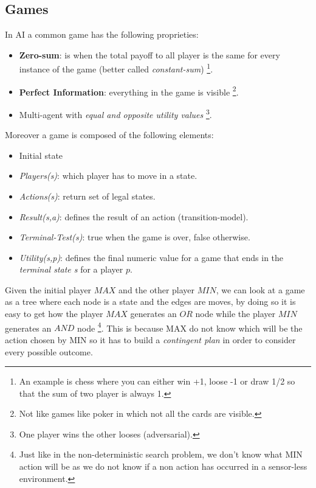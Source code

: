 \documentclass[10pt,a4paper]{article}
\begin{document}
\subsection{Games}
In AI a common game has the following proprieties:

\begin{itemize}
\item \textbf{Zero-sum}: is when the total payoff to all player is the same for every instance of the game (better called \textit{constant-sum}) \footnote{An example is chess where you can either win +1, loose -1 or draw 1/2 so that the sum of two player is always 1.}.

\item \textbf{Perfect Information}: everything in the game is visible \footnote{Not like games like poker in which not all the cards are visible.}.

\item Multi-agent with \textit{equal and opposite utility values} \footnote{One player wins the other looses (adversarial).}.

\end{itemize}


Moreover a game is composed of the following elements:
\begin{itemize}
\item Initial state
\item \textit{Players(s)}: which player has to move in a state.
\item \textit{Actions(s)}: return set of legal states.
\item \textit{Result(s,a)}: defines the result of an action (transition-model).
\item \textit{Terminal-Test(s)}: true when the game is over, false otherwise.
\item \textit{Utility(s,p)}: defines the final numeric value for a game that ends in the \textit{terminal state s} for a player $p$.
\end{itemize}

Given the initial player $MAX$ and the other player $MIN$,
we can look at a game as a tree where each node is a state and the edges are moves, by doing so it is easy to get how the player $MAX$ generates an $OR$ node while the player $MIN$ generates an $AND$ node \footnote{Just like in the non-deterministic search problem, we don't know what MIN action will be as we do not know if a non action has occurred in a sensor-less environment.}. This is because MAX do not know which will be the action chosen by MIN so it has to build a \textit{contingent plan} in order to consider every possible outcome.\\
\end{document}

